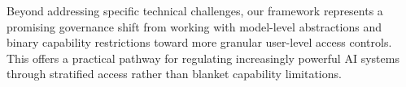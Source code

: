 \documentclass{article}
\theoremstyle{plain}
\theoremstyle{definition}
\theoremstyle{remark}
\begin{document}
Beyond addressing specific technical challenges, our framework represents a promising governance shift from working with model-level abstractions and binary capability restrictions toward more granular user-level access controls. This offers a practical pathway for regulating increasingly powerful AI systems through stratified access rather than blanket capability limitations.




\newpage
\appendix
\onecolumn
\end{document}
